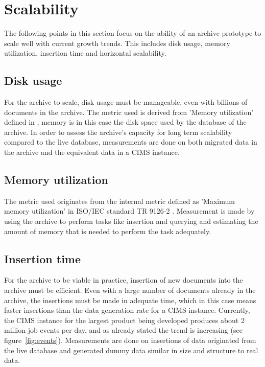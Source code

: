 \section{Scalability}
The following points in this section focus on the ability of an archive prototype to scale well with current growth trends. This includes disk usage, memory utilization, insertion time and horizontal scalability.

\subsection{Disk usage}
For the archive to scale, disk usage must be manageable, even with billions of documents in the archive. The metric used is derived from 'Memory utilization' defined in \cite{isoInternalMetric}, memory is in this case the disk space used by the database of the archive. In order to assess the archive's capacity for long term scalability compared to the live database, measurements are done on both migrated data in the archive and the equivalent data in a CIMS instance.

\subsection{Memory utilization}
The metric used originates from the internal metric defined as 'Maximum memory utilization' in ISO/IEC standard TR 9126-2 \cite{isoExternalMetric}. Measurement is made by using the archive to perform tasks like insertion and querying and estimating the amount of memory that is needed to perform the task adequately. 

\subsection{Insertion time}
For the archive to be viable in practice, insertion of new documents into the archive must be efficient. Even with a large number of documents already in the archive, the insertions must be made in adequate time, which in this case means faster insertions than the data generation rate for a CIMS instance. Currently, the CIMS instance for the largest product being developed produces about 2 million job events per day, and as already stated the trend is increasing (see figure~\ref{fig:events}).
Measurements are done on insertions of data originated from the live database and generated dummy data similar in size and structure to real data.


